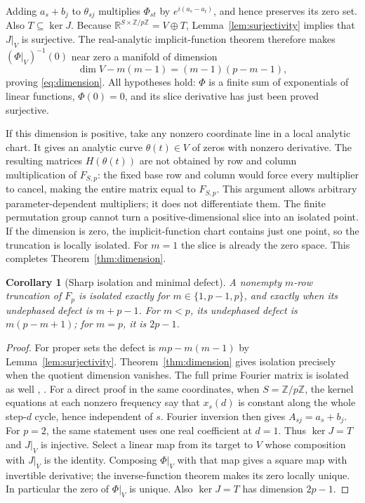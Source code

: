 \documentclass[11pt]{article}
\newtheorem{corollary}[theorem]{Corollary}
\newcommand{\R}{\mathbb R}
\newcommand{\Z}{\mathbb Z}
\begin{document}
Adding $a_s+b_j$ to $\theta_{sj}$ multiplies $\Phi_{st}$ by
$e^{i(a_s-a_t)}$, and hence preserves its zero set. Also $T\subseteq\ker J$.
Because $\R^{S\times\Z/p\Z}=V\oplus T$, Lemma~\ref{lem:surjectivity}
implies that $J|_V$ is surjective. The real-analytic implicit-function
theorem therefore makes $(\Phi|_V)^{-1}(0)$ near zero a manifold of dimension
\[
\dim V-m(m-1)=(m-1)(p-m-1),
\]
proving \eqref{eq:dimension}. All hypotheses hold: $\Phi$ is a finite sum
of exponentials of linear functions, $\Phi(0)=0$, and its slice derivative
has just been proved surjective.

If this dimension is positive, take any nonzero coordinate line in a
local analytic chart. It gives an analytic curve $\theta(t)\in V$ of
zeros with nonzero derivative. The resulting matrices $H(\theta(t))$
are not obtained by row and column multiplication of $F_{S,p}$:
the fixed base row and column would force every multiplier to cancel,
making the entire matrix equal to $F_{S,p}$. This argument allows arbitrary
parameter-dependent multipliers; it does not differentiate them.
The finite permutation group cannot turn a positive-dimensional
slice into an isolated point.
If the dimension is zero, the implicit-function chart contains just one
point, so the truncation is locally isolated. For $m=1$ the slice is
already the zero space. This completes Theorem~\ref{thm:dimension}.

\begin{corollary}[Sharp isolation and minimal defect]\label{cor:classification}
A nonempty $m$-row truncation of $F_p$ is isolated exactly for
$m\in\{1,p-1,p\}$, and exactly when its undephased defect is $m+p-1$.
For $m<p$, its undephased defect is $m(p-m+1)$; for $m=p$, it is $2p-1$.
\end{corollary}
\begin{proof}
For proper sets the defect is $mp-m(m-1)$ by Lemma~\ref{lem:surjectivity}.
Theorem~\ref{thm:dimension} gives isolation precisely when the quotient
dimension vanishes. The full prime Fourier matrix is isolated as well
\cite[Section~5.1(i)]{TZ}, \cite[Proposition~1.12]{BOP}.
For a direct proof in the same coordinates,
when $S=\Z/p\Z$, the kernel equations at each nonzero frequency say that
$x_s(d)$ is constant along the whole step-$d$ cycle, hence independent
of $s$. Fourier inversion then gives $A_{sj}=a_s+b_j$.
For $p=2$, the same statement uses one real coefficient at $d=1$.
Thus $\ker J=T$ and $J|_V$ is injective. Select a linear map from its
target to $V$ whose composition with $J|_V$ is the identity. Composing
$\Phi|_V$ with that map gives a square map with invertible derivative;
the inverse-function theorem makes its zero locally unique. In particular
the zero of $\Phi|_V$ is unique. Also $\ker J=T$ has dimension $2p-1$.
\end{proof}
\end{document}
